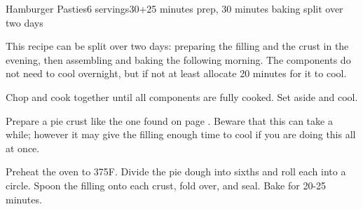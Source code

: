 \documentclass[../Cookbook.tex]{subfiles}
\begin{document}
\begin{recipe}{Hamburger Pasties}{6 servings}{30+25 minutes prep, 30 minutes baking split over two days}

This recipe can be split over two days: preparing the filling and the crust in the evening, then assembling and baking the following morning. The components do not need to cool overnight, but if not at least allocate 20 minutes for it to cool.

Chop and cook together until all components are fully cooked. Set aside and cool.

\newstep
Prepare a pie crust like the one found on page \pageref{PieCrust}. Beware that this can take a while; however it may give the filling enough time to cool if you are doing this all at once.

\newstep
Preheat the oven to 375\0F.
Divide the pie dough into sixths and roll each into a circle. Spoon the filling onto each crust, fold over, and seal. Bake for 20-25 minutes.

\end{recipe}
\end{document}
